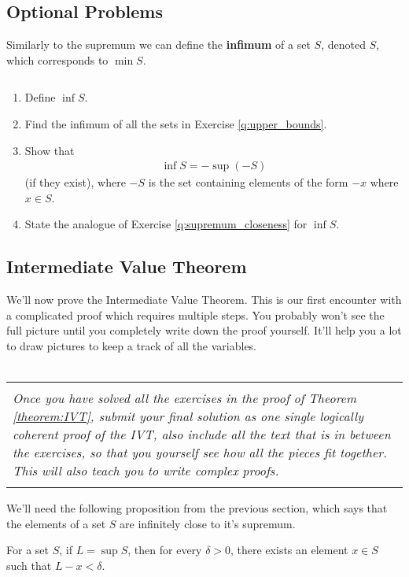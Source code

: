 \subsection*{Optional Problems}

Similarly to the supremum we can define the {\bf infimum} of a set $S$, denoted $S$, which corresponds to $\min S$.

\begin{exercise}$ $
	\begin{enumerate}
		\item Define $\inf S$.
		\item Find the infimum of all the sets in Exercise \ref{q:upper_bounds}.
		\item Show that \begin{align*}
			      \inf S = - \sup (-S)
		      \end{align*} (if they exist), where $-S$ is the set containing elements of the form $-x$ where $x \in S$.
		\item State the analogue of Exercise \ref{q:supremum_closeness} for $\inf S$.
	\end{enumerate}
\end{exercise}




\newpage
\subsection{Intermediate Value Theorem}

We'll now prove the Intermediate Value Theorem. This is our first encounter with a complicated proof which requires multiple steps. You probably won't see the full picture until you completely write down the proof yourself. It'll help you a lot to draw pictures to keep a track of all the variables. \\\\
\begin{tabular}{|p{\textwidth}|}
  \hline \\{\it Once you have solved all the exercises in the proof of Theorem \ref{theorem:IVT}, submit your final solution as one single logically coherent proof of the IVT, also include all the text that is in between the exercises, so that you yourself see how all the pieces fit together. This will also teach you to write complex proofs.}\\\\
  \hline
\end{tabular}

\vspace{1em}
We'll need the following proposition from the previous section, which says that the elements of a set $S$ are infinitely close to it's supremum.
\begin{prop}
  \label{thm:sup_lemma}
  For a set $S$, if $L = \sup S$, then
  for every $ \delta > 0 $, there exists an element $x \in S$ such that $L - x < \delta$.
\end{prop}

